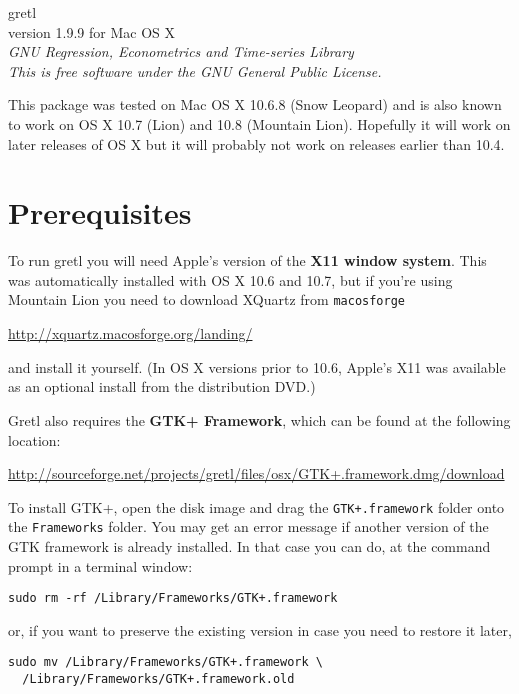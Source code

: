 \documentclass[11pt]{article}
\begin{document}
\begin{center}
{\color{gold} \titlefont gretl} \\[1ex]
version 1.9.9 for Mac OS X \\[2ex]

\textit{GNU Regression, Econometrics and Time-series Library\\
  This is free software under the GNU General Public License.}

\end{center}

This package was tested on Mac OS X 10.6.8 (Snow Leopard) and
is also known to work on OS X 10.7 (Lion) and 10.8 (Mountain Lion).
Hopefully it will work on later releases of OS X but it will probably
not work on releases earlier than 10.4.

\section{Prerequisites}
\label{sec:os}

To run \textsf{gretl} you will need Apple's version of the \textbf{X11
  window system}. This was automatically installed with OS X 10.6 and
10.7, but if you're using Mountain Lion you need to download XQuartz
from \texttt{macosforge}

\url{http://xquartz.macosforge.org/landing/}

and install it yourself. (In OS X versions prior to 10.6, Apple's X11 was 
available as an optional install from the distribution DVD.)

\textsf{Gretl} also requires the \textbf{GTK+ Framework}, which can be
found at the following location:

\url{http://sourceforge.net/projects/gretl/files/osx/GTK+.framework.dmg/download}

To install GTK+, open the disk image and drag the
\texttt{GTK+.framework} folder onto the \texttt{Frameworks}
folder. You may get an error message if another version of the GTK
framework is already installed. In that case you can do, at the
command prompt in a terminal window:

\verb|sudo rm -rf /Library/Frameworks/GTK+.framework|

or, if you want to preserve the existing version in case you need to
restore it later,
\begin{verbatim}
sudo mv /Library/Frameworks/GTK+.framework \
  /Library/Frameworks/GTK+.framework.old
\end{verbatim}
\end{document}
